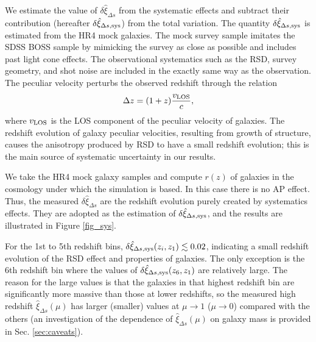 \documentclass[iop]{emulateapj}
\begin{document}
We estimate the value of $\delta \hat\xi_{\Delta s}$ from the systematic effects and subtract their contribution
(hereafter $\delta\hat\xi_{\Delta s, \rm sys}$) from the total variation.
The quantity $\delta\hat\xi_{\Delta s, \rm sys}$ is estimated from the HR4 mock galaxies.
The mock survey sample imitates the SDSS BOSS sample by mimicking
the survey as close as possible and includes past light cone effects.
The observational systematics such as the RSD, survey geometry, and shot noise
are included in the exactly same way as the observation.
The peculiar velocity perturbs the observed redshift through the relation
\begin{equation}\label{eq:zvpeu}
\Delta z = (1+z) \frac{v_{{\rm LOS}}}{c},
\end{equation}
where $v_{\rm LOS}$ is the LOS component of the peculiar velocity of galaxies.
The redshift evolution of galaxy peculiar velocities, 
resulting from growth of structure,
causes the anisotropy produced by RSD to have a small redshift evolution; 
this is the main source of systematic uncertainty in our results. 

We take the HR4 mock galaxy samples and compute $r(z)$ of galaxies in the cosmology under which the simulation is based.
In this case there is no AP effect. 
Thus, the measured $\delta \hat\xi_{\Delta s}$ are the redshift evolution purely created by systematics effects.
They are adopted as the estimation of $\delta\hat\xi_{\Delta s, \rm sys}$,
and the results are illustrated in Figure \ref{fig_sys}. %

For the 1st to 5th redshift bins, $\delta\hat\xi_{\Delta s, \rm sys}(z_i,z_1)\lesssim0.02$,
indicating a small redshift evolution of the RSD effect and properties of galaxies.
The only exception is the 6th redshift bin where the values of $\delta\hat\xi_{\Delta s, \rm sys}(z_6,z_1)$ are relatively large.
The reason for the large values is that the galaxies in that highest redshift bin are significantly more massive than those at lower redshifts,
so the measured high redshift $\hat\xi_{\Delta s}(\mu)$ has larger (smaller) values at $\mu\rightarrow1$ ($\mu\rightarrow0$) 
compared with the others
(an investigation of the dependence of $\hat\xi_{\Delta s}(\mu)$ on galaxy mass is provided in Sec. \ref{sec:caveats}).

\end{document}
